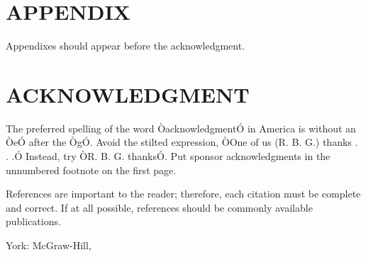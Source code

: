 \documentclass[a4paper, 10pt, conference]{IEEEconf}
\begin{document}
\section*{APPENDIX}

Appendixes should appear before the acknowledgment.

\section*{ACKNOWLEDGMENT}

The preferred spelling of the word ÒacknowledgmentÓ in America is without an ÒeÓ after the ÒgÓ. Avoid the stilted expression, ÒOne of us (R. B. G.) thanks . . .Ó  Instead, try ÒR. B. G. thanksÓ. Put sponsor acknowledgments in the unnumbered footnote on the first page.




References are important to the reader; therefore, each citation must be complete and correct. If at all possible, references should be commonly available publications.



\begin{thebibliography}{99}

  York: McGraw-Hill, 







\end{thebibliography}
\end{document}
